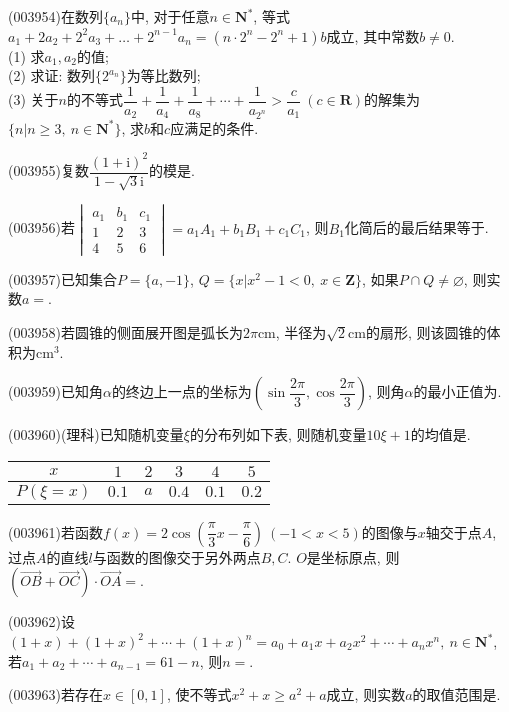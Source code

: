 \item (003954)在数列$\{a_n\}$中, 对于任意$n\in \mathbf{N}^*$, 等式$a_1+2a_2+2^2a_3+\dots+2^{n-1}a_n=(n\cdot 2^n-2^n+1)b$成立, 其中常数$b\ne 0$.\\
(1) 求$a_1,a_2$的值;\\
(2) 求证: 数列$\{2^{a_n}\}$为等比数列;\\
(3) 关于$n$的不等式$\dfrac{1}{a_2}+\dfrac{1}{a_4}+\dfrac{1}{a_8}+\cdots+\dfrac{1}{a_{2^n}}>\dfrac{c}{a_1} \ (c\in \mathbf{R})$的解集为$\{n|n\ge 3, \ n\in \mathbf{N}^*\}$, 求$b$和$c$应满足的条件.
\item (003955)复数$\dfrac{(1+\mathrm{i})^2}{1-\sqrt{3}\mathrm{i}}$的模是.
\item (003956)若$\begin{vmatrix}a_1 & b_1 & c_1\\1 & 2 & 3\\4 & 5 & 6\end{vmatrix}=a_1A_1+b_1B_1+c_1C_1$, 则$B_1$化简后的最后结果等于.
\item (003957)已知集合$P=\{a,-1\}$, $Q=\{x|x^2-1<0, \ x\in \mathbf{Z}\}$, 如果$P\cap Q\ne\varnothing$, 则实数$a=$.
\item (003958)若圆锥的侧面展开图是弧长为$2\pi$cm, 半径为$\sqrt{2}$cm的扇形, 则该圆锥的体积为cm$^3$.
\item (003959)已知角$\alpha$的终边上一点的坐标为$\left(\sin\dfrac{2\pi}{3},\cos\dfrac{2\pi}{3}\right)$, 则角$\alpha$的最小正值为.
\item (003960)(理科)已知随机变量$\xi$的分布列如下表, 则随机变量$10\xi+1$的均值是.
\begin{center}
\begin{tabular}{|c|c|c|c|c|c|}
\hline
$x$ & $1$ & $2$ & $3$ & $4$ & $5$\\ \hline
$P(\xi=x)$ & $0.1$ & $a$ & $0.4$ & $0.1$ & $0.2$\\ \hline
\end{tabular}
\end{center}
\item (003961)若函数$f(x)=2\cos\left(\dfrac{\pi}{3}x-\dfrac{\pi}{6}\right) \ (-1<x<5)$的图像与$x$轴交于点$A$, 过点$A$的直线$l$与函数的图像交于另外两点$B,C$. $O$是坐标原点, 则$(\overrightarrow{OB}+\overrightarrow{OC})\cdot\overrightarrow{OA}=$.
\item (003962)设$(1+x)+(1+x)^2+\cdots+(1+x)^n=a_0+a_1x+a_2x^2+\cdots+a_nx^n, \ n\in \mathbf{N}^*$, 若$a_1+a_2+\cdots+a_{n-1}=61-n$, 则$n=$.
\item (003963)若存在$x\in [0,1]$, 使不等式$x^2+x\ge a^2+a$成立, 则实数$a$的取值范围是.
